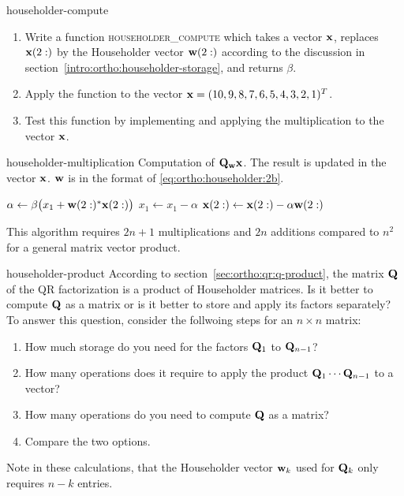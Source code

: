 \begin{Problem}{householder-compute}
  \begin{enumerate}
  \item Write a function \textsc{householder\_compute} which takes a
    vector $\mathbf x$, replaces $\mathbf x(2:)$ by the Householder vector
    $\mathbf w(2:)$ according to the discussion in
    section~\ref{intro:ortho:householder-storage}, and returns
    $\beta$.

  \item Apply the function to the vector $\mathbf x=(10,9,8,7,6,5,4,3,2,1)^T$.
  \item Test this function by implementing
     and applying the
    multiplication to the vector $\mathbf x$.
  \end{enumerate}
\end{Problem}

\begin{Algorithm}{householder-multiplication}
  Computation of $\mathbf Q_{\mathbf w}\mathbf x$. The result is updated in the vector
  $\mathbf x$. $\mathbf w$ is in the format of \eqref{eq:ortho:householder:2b}.

  \hrulefill
  \vspace*{2mm}
  \begin{algorithmic}[1]
    \State $\alpha \gets \beta \bigl( x_1 + \mathbf w(2:)^*\mathbf x(2:)\bigr)$
    \State $x_1 \gets x_1 - \alpha$
    \State $\mathbf x(2:) \gets \mathbf x(2:) - \alpha \mathbf w(2:)$
    \EndIf
    \EndFunction
  \end{algorithmic}
   \hrulefill

   This algorithm requires $2n+1$ multiplications and $2n$ additions
   compared to $n^2$ for a general matrix vector product.
\end{Algorithm}

\begin{Problem}{householder-product}
  According to section~\ref{sec:ortho:qr:q-product}, the matrix
  $\mathbf Q$ of the QR factorization is a product of Householder
  matrices. Is it better to compute $\mathbf Q$ as a matrix or is it
  better to store and apply its factors separately? To answer this
  question, consider the follwoing steps for an $n\times n$ matrix:
  \begin{enumerate}
  \item How much storage do you need for the factors $\mathbf Q_1$ to $\mathbf Q_{n-1}$?
  \item How many operations does it require to apply the product
    $\mathbf Q_1\cdots\mathbf Q_{n-1}$ to a vector?
  \item How many operations do you need to compute $\mathbf Q$ as a matrix?
  \item Compare the two options.
  \end{enumerate}
  Note in these calculations, that the Householder vector $\mathbf w_k$ used
  for $\mathbf Q_k$ only requires $n-k$ entries.
\end{Problem}


